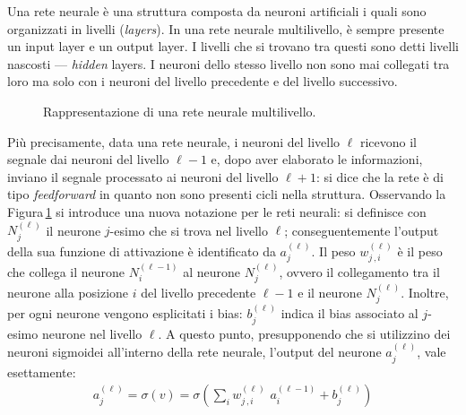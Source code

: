 Una rete neurale è una struttura composta da neuroni artificiali i quali sono organizzati in livelli (\textit{layers}). In una rete neurale multilivello, è sempre presente un input layer e un output layer. I livelli che si trovano tra questi sono detti livelli nascosti — \textit{hidden} layers. I neuroni dello stesso livello non sono mai collegati tra loro ma solo con i neuroni del livello precedente e del livello successivo.
% 
\begin{figure}[!b]
    \centering
    
    \caption[Rappresentazione di una rete neurale multilivello.]{Rappresentazione di una rete neurale multilivello.}\label{fig:neural-network}
\end{figure}
% 
Più precisamente, data una rete neurale, i neuroni del livello $\ell$ ricevono il segnale dai neuroni del livello $\ell-1$ e, dopo aver elaborato le informazioni, inviano il segnale processato ai neuroni del livello $\ell+1$: si dice che la rete è di tipo \textit{feedforward} in quanto non sono presenti cicli nella struttura. Osservando la Figura\,\ref{fig:neural-network} si introduce una nuova notazione per le reti neurali: si definisce con $N^{(\ell)}_j$ il neurone $j$-esimo che si trova nel livello $\ell$; conseguentemente l'output della sua funzione di attivazione è identificato da $a^{(\ell)}_j$. Il peso $w^{(\ell)}_{j\,,i}$ è il peso che collega il neurone $N^{(\ell - 1)}_i$ al neurone $N^{(\ell)}_j$, ovvero il collegamento tra il neurone alla posizione $i$ del livello precedente $\ell-1$ e il neurone $N^{(\ell)}_j$. Inoltre, per ogni neurone vengono esplicitati i bias: $b^{(\ell)}_j$ indica il bias associato al $j$-esimo neurone nel livello $\ell$. A questo punto, presupponendo che si utilizzino dei neuroni sigmoidei all'interno della rete neurale, l'output del neurone  $a^{(\ell)}_j$, vale esettamente:
% 
\begin{gather*}
     a^{(\ell)}_j = \sigma\left( v \right) = \sigma\left( \sum_i w^{(\ell)}_{j\,,i} \,\, a^{(\ell - 1)}_i + b^{(\ell)}_j \right)
\end{gather*}

